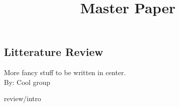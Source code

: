 \cleardoublepage
\title{Master Paper}
\begin{centering}
 \chapter*{Litterature Review}
More fancy stuff to be written in center.\\
By: Cool group
\end{centering}

\cleardoublepage
  {review/intro}